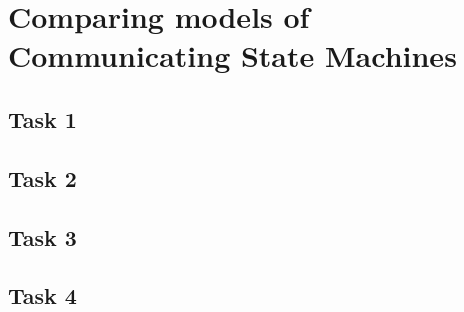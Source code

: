 \section{Comparing models of Communicating State Machines}

\subsection{Task 1}


\subsection{Task 2}


\subsection{Task 3}


\subsection{Task 4}
